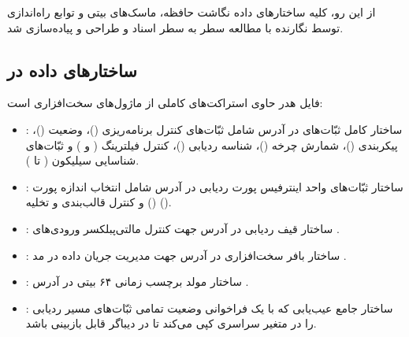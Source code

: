 از این رو، کلیه ساختارهای داده نگاشت حافظه، ماسک‌های بیتی و توابع راه‌اندازی توسط نگارنده با مطالعه سطر به سطر اسناد  و  طراحی و پیاده‌سازی شد.

\subsection{ساختارهای داده در }
فایل هدر  حاوی استراکت‌های کاملی از ماژول‌های سخت‌افزاری است:
\begin{itemize}
    \item {}: ساختار کامل ثبّات‌های  در آدرس  شامل ثبّات‌های کنترل برنامه‌ریزی ()، وضعیت ()، پیکربندی ()، شمارش چرخه ()، شناسه ردیابی ()، کنترل فیلترینگ ( و ) و ثبّات‌های شناسایی سیلیکون ( تا ).
    \item {}: ساختار ثبّات‌های واحد اینترفیس پورت ردیابی در آدرس  شامل انتخاب اندازه پورت () و کنترل قالب‌بندی و تخلیه ().
    \item {}: ساختار قیف ردیابی در آدرس  جهت کنترل مالتی‌پبلکسر ورودی‌های .
    \item {}: ساختار بافر  سخت‌افزاری در آدرس  جهت مدیریت جریان داده در مد .
    \item {}: ساختار مولد برچسب زمانی ۶۴ بیتی در آدرس .
    \item {}: ساختار جامع عیب‌یابی که با یک فراخوانی وضعیت تمامی ثبّات‌های مسیر ردیابی را در متغیر سراسری  کپی می‌کند تا در دیباگر قابل بازبینی باشد.
\end{itemize}

